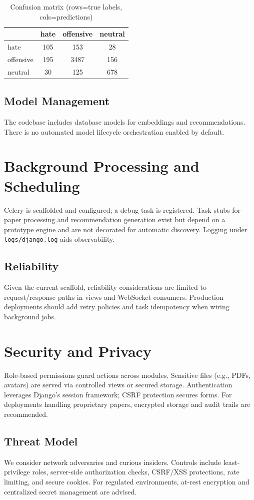 \documentclass[conference]{IEEEtran}
\begin{document}
\begin{table}[t]
\centering
\caption{Confusion matrix (rows=true labels, cols=predictions)}
\begin{tabular}{lccc}
\toprule
 & hate & offensive & neutral \\
\midrule
hate & 105 & 153 & 28 \\
offensive & 195 & 3487 & 156 \\
neutral & 30 & 125 & 678 \\
\bottomrule
\end{tabular}
\label{tab:hate-conf}
\end{table}

\subsection{Model Management}
The codebase includes database models for embeddings and recommendations. There is no automated model lifecycle orchestration enabled by default.

\section{Background Processing and Scheduling}
Celery is scaffolded and configured; a debug task is registered. Task stubs for paper processing and recommendation generation exist but depend on a prototype engine and are not decorated for automatic discovery. Logging under \texttt{logs/django.log} aids observability.

\subsection{Reliability}
Given the current scaffold, reliability considerations are limited to request/response paths in views and WebSocket consumers. Production deployments should add retry policies and task idempotency when wiring background jobs.

\section{Security and Privacy}
Role-based permissions guard actions across modules. Sensitive files (e.g., PDFs, avatars) are served via controlled views or secured storage. Authentication leverages Django's session framework; CSRF protection secures forms. For deployments handling proprietary papers, encrypted storage and audit trails are recommended.

\subsection{Threat Model}
We consider network adversaries and curious insiders. Controls include least-privilege roles, server-side authorization checks, CSRF/XSS protections, rate limiting, and secure cookies. For regulated environments, at-rest encryption and centralized secret management are advised.
\end{document}

